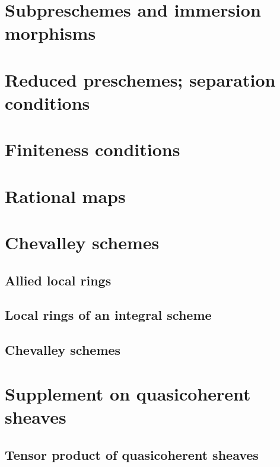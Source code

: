 \documentclass[10pt,oneside]{amsart}
\begin{document}
    \section{Subpreschemes and immersion morphisms}

    \section{Reduced preschemes; separation conditions}

    \section{Finiteness conditions}

    \section{Rational maps}

    \section{Chevalley schemes}

        \subsection{Allied local rings}
        

        \subsection{Local rings of an integral scheme}
        

        \subsection{Chevalley schemes}
        

    \section{Supplement on quasicoherent sheaves}

        \subsection{Tensor product of quasicoherent sheaves}
        
\end{document}
